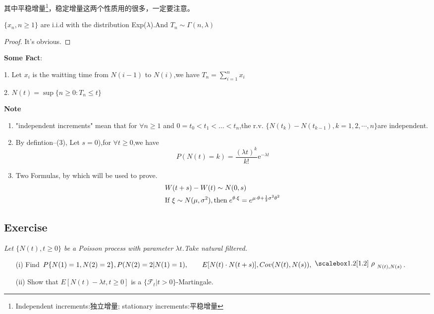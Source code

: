 其中平稳增量\footnote[1]{Independent increments:独立增量; stationary increments:平稳增量}，稳定增量这两个性质用的很多，一定要注意。

\begin{theorem}
    $\{x_n,n\ge 1 \}$ are i.i.d with the distribution \mbox{\rm Exp}($\lambda $).And $T_n \sim \Gamma  (n,\lambda) $    
\end{theorem}
\begin{proof}
    It's obvious.
\end{proof}

\clearpage
{\bf Some Fact}:\par
1. Let $x_i$ is the waitting time from $N(i-1)$ to $N(i)$,we have $T_n = \sum_{i=1}^n x_i$\par
2. $N(t) = \sup\{n\ge 0:T_n\le t\}$

{\bf Note}\par
\begin{enumerate}
    \item "independent increments" mean that for $\forall n \ge 1$ and $0=t_0<t_1<\ldots<t_n$,the r.v.
    $\{N(t_k) - N(t_{k-1}),k=1,2,\cdots,n \}$are independent.
    \item  By defintion--(3), Let $s=0$),for $\forall t\ge 0$,we have
    \[P(N(t) = k) = \frac{(\lambda t)^k}{k!} \mathrm{e}^{-\lambda t} \]
    \item Two Formulas, by which will be used to prove.  
        \begin{align*}
            & W(t+s) - W(t)\sim N(0,s) \\
            & {\rm If\;} \xi \sim N(\mu, \sigma^2), {\rm then\;} e^{\theta\cdot\xi} = e^{\mu\cdot\theta+\frac12\sigma^2\theta^2}
        \end{align*}
\end{enumerate}    





\clearpage
\subsection*{Exercise}{\it
Let $\{N(t),t\ge 0 \}$ be a Poisson process with parameter $\lambda t$.Take natural filtered.
\begin{enumerate}
    \item[(i)] Find $P\{N(1)=1,N(2)=2\},P(N(2)=2|N(1)=1),\\
        \hspace*{2em} E[N(t)\cdot N(t+s)],Cov(N(t),N(s)),{\imd[1.2]{\rho}_{N(t),N(s)}}$.
    \item[(ii)] Show that $E[N(t)-\lambda t,t\ge 0]$ is a $ \{ \mathcal{F}_t|t>0 \}$-Martingale.
\end{enumerate}
}


